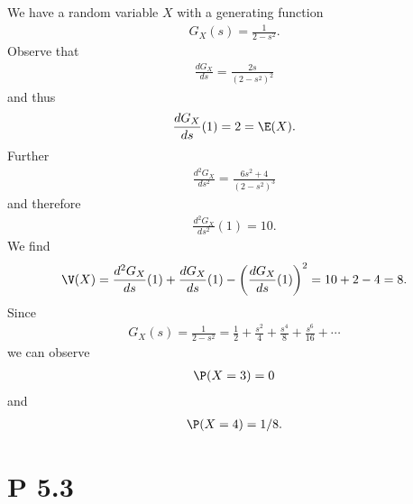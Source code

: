 \documentclass{article}
\begin{document}
We have a random variable $X$ with a generating function
\begin{align*}
	G_X(s) = \frac{1}{2-s^2}.
\end{align*}
Observe that
\begin{align*}
	\frac{dG_X}{ds} = \frac{2s}{(2-s^2)^2}
\end{align*}
and thus
\begin{align*}
	\frac{dG_X}{ds}(1) = 2 = \E(X).
\end{align*}
Further
\begin{align*}
	\frac{d^2G_X}{ds^2}=\frac{6s^2+4}{(2-s^2)^3}
\end{align*}
and therefore
\begin{align*}
	\frac{d^2G_X}{ds^2}(1) = 10.
\end{align*}
We find
\begin{align*}
	\V(X) = \frac{d^2G_X}{ds}(1) + \frac{dG_X}{ds}(1) - \left(\frac{dG_X}{ds}(1)\right)^2
	= 10 + 2 - 4 = 8.
\end{align*}
Since
\begin{align*}
	G_X(s) = \frac{1}{2-s^2} = \frac{1}{2} + \frac{s^2}{4} + \frac{s^4}{8} + \frac{s^6}{16} + \cdots
\end{align*}
we can observe
\begin{align*}
	\P(X=3) = 0
\end{align*}
and
\begin{align*}
	\P(X=4) = 1/8.
\end{align*}


\section*{P 5.3}
\end{document}
